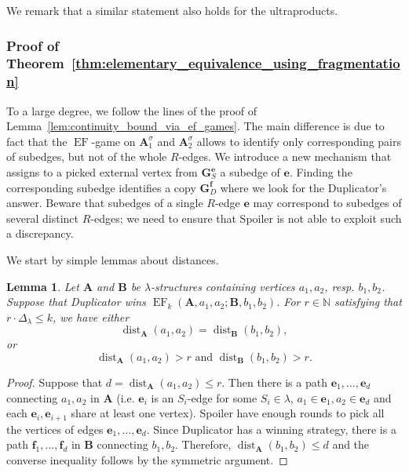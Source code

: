 \documentclass[11pt]{article}
\theoremstyle{plain}
\newtheorem{lemma}[theorem]{Lemma}
\theoremstyle{definition}
\theoremstyle{remark}
\DeclareMathOperator\dist{dist}
\newcommand{\N}{\mathbb{N}}
\DeclareMathOperator{\EF}{EF}
\newcommand{\str}[1]{\mathbf{#1}}
\newcommand{\maxarity}[1]{\Delta_{#1}}
\newcommand{\tpl}[1]{{\bm{#1}}}
\begin{document}
We remark that a similar statement also holds for the ultraproducts.

\subsubsection{Proof of Theorem~\ref{thm:elementary_equivalence_using_fragmentation}}\label{sssec:proof_of_fragmentation}

To a large degree, we follow the lines of the proof of Lemma~\ref{lem:continuity_bound_via_ef_games}.
The main difference is due to fact that the $\EF$-game on $\str{A}_1^\sigma$ and $\str{A}_2^\sigma$ allows to identify only corresponding pairs of subedges, but not of the whole $R$-edges.
We introduce a new mechanism that assigns to a picked external vertex from $\str{G}_S^\tpl{e}$ a subedge of $\tpl{e}$.
Finding the corresponding subedge identifies a copy $\str{G}_D^\tpl{f}$ where we look for the Duplicator's answer.
Beware that subedges of a single $R$-edge $\tpl{e}$ may correspond to subedges of several distinct $R$-edges; we need to ensure that Spoiler is not able to exploit such a discrepancy.

We start by simple lemmas about distances.

\begin{lemma}\label{lem:measuring_distances}
    Let $\str{A}$ and $\str{B}$ be $\lambda$-structures containing vertices $a_1, a_2$, resp. $b_1, b_2$.
    Suppose that Duplicator wins $\EF_k(\str{A}, a_1, a_2; \str{B}, b_1, b_2)$.
    For $r \in \N$ satisfying that $r \cdot \maxarity{\lambda} \leq k$, we have either
    \[
        \dist_\str{A}(a_1, a_2) = \dist_\str{B}(b_1, b_2)
        ,
    \]
    or
    \[
        \dist_\str{A}(a_1, a_2) > r \text{ and } \dist_\str{B}(b_1, b_2) > r
        .
    \]
\end{lemma}
\begin{proof}
    Suppose that $d = \dist_\str{A}(a_1, a_2) \leq r$.
    Then there is a path $\tpl{e}_1, \dots, \tpl{e}_d$ connecting $a_1, a_2$ in $\str{A}$ (i.e. $\tpl{e}_i$ is an $S_i$-edge for some $S_i \in \lambda$, $a_1 \in \tpl{e}_1, a_2 \in \tpl{e}_d$ and each $\tpl{e}_i, \tpl{e}_{i+1}$ share at least one vertex).
    Spoiler have enough rounds to pick all the vertices of edges $\tpl{e}_1, \dots, \tpl{e}_d$.
    Since Duplicator has a winning strategy, there is a path $\tpl{f}_1, \dots, \tpl{f}_d$ in $\str{B}$ connecting $b_1, b_2$.
    Therefore, $\dist_\str{A}(b_1, b_2) \leq d$ and the converse inequality follows by the symmetric argument.
\end{proof}
\end{document}
